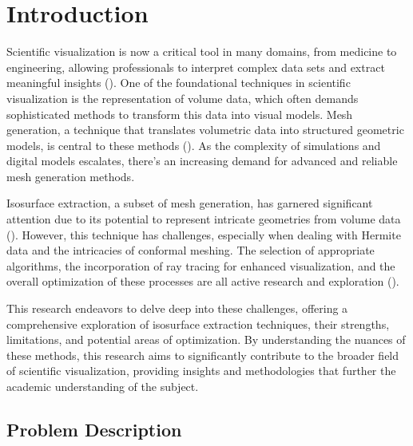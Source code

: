 \chapter{Introduction}
\label{Chapter1} 
\newcommand{\keyword}[1]{\textbf{#1}}
\newcommand{\tabhead}[1]{\textbf{#1}}
\newcommand{\code}[1]{\texttt{#1}}
\newcommand{\file}[1]{\texttt{\bfseries#1}}
\newcommand{\option}[1]{\texttt{\itshape#1}}

Scientific visualization is now a critical tool in many domains, from medicine to engineering, allowing professionals to interpret complex data sets and extract meaningful insights (\cite{baines_2008}). One of the foundational techniques in scientific visualization is the representation of volume data, which often demands sophisticated methods to transform this data into visual models. Mesh generation, a technique that translates volumetric data into structured geometric models, is central to these methods (\cite{Wünsche_1997}). As the complexity of simulations and digital models escalates, there's an increasing demand for advanced and reliable mesh generation methods.

Isosurface extraction, a subset of mesh generation, has garnered significant attention due to its potential to represent intricate geometries from volume data (\cite{Lorensen_1987}). 
However, this technique has challenges, especially when dealing with Hermite data and the intricacies of conformal meshing. 
The selection of appropriate algorithms, the incorporation of ray tracing for enhanced visualization, and the overall optimization of these processes are all active research and exploration (\cite{Krüger_2003}).

This research endeavors to delve deep into these challenges, offering a comprehensive exploration of isosurface extraction techniques, their strengths, limitations, and potential areas of optimization. By understanding the nuances of these methods, this research aims to significantly contribute to the broader field of scientific visualization, providing insights and methodologies that further the academic understanding of the subject.

\section{Problem Description}

